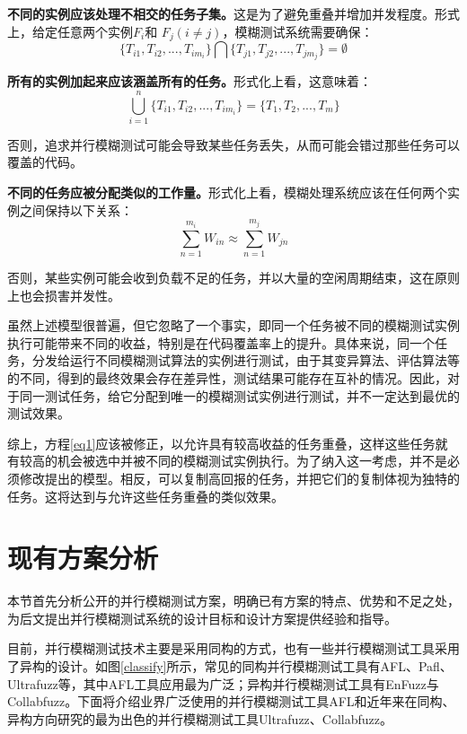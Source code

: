 \documentclass[master]{thesis-uestc}
\begin{document}
\textbf{不同的实例应该处理不相交的任务子集。}这是为了避免重叠并增加并发程度。形式上，给定任意两个实例$F_i$和 $F_j (i \neq j)$，模糊测试系统需要确保：
\begin{equation}
\{T_{i1}, T_{i2}, ..., T_{im_i}\} \bigcap \{T_{j1}, T_{j2}, ..., T_{jm_j}\} = \emptyset
\label{eq1}
\end{equation}

\textbf{所有的实例加起来应该涵盖所有的任务。}形式化上看，这意味着：
\begin{equation}
\bigcup_{i = 1}^{n} \{T_{i1}, T_{i2}, ..., T_{im_i}\} = \{T_{1}, T_{2}, ..., T_{m}\}
\end{equation}

否则，追求并行模糊测试可能会导致某些任务丢失，从而可能会错过那些任务可以覆盖的代码。

\textbf{不同的任务应被分配类似的工作量。}形式化上看，模糊处理系统应该在任何两个实例之间保持以下关系：
\begin{equation}
\sum_{n = 1}^{m_i}W_{in} \approx \sum_{n = 1}^{m_j}W_{jn} 
\end{equation}

否则，某些实例可能会收到负载不足的任务，并以大量的空闲周期结束，这在原则上也会损害并发性。

虽然上述模型很普遍，但它忽略了一个事实，即同一个任务被不同的模糊测试实例执行可能带来不同的收益，特别是在代码覆盖率上的提升。具体来说，同一个任务，分发给运行不同模糊测试算法的实例进行测试，由于其变异算法、评估算法等的不同，得到的最终效果会存在差异性，测试结果可能存在互补的情况。因此，对于同一测试任务，给它分配到唯一的模糊测试实例进行测试，并不一定达到最优的测试效果。

综上，方程\ref{eq1}应该被修正，以允许具有较高收益的任务重叠，这样这些任务就有较高的机会被选中并被不同的模糊测试实例执行。为了纳入这一考虑，并不是必须修改提出的模型。相反，可以复制高回报的任务，并把它们的复制体视为独特的任务。这将达到与允许这些任务重叠的类似效果。

\section{现有方案分析}
本节首先分析公开的并行模糊测试方案，明确已有方案的特点、优势和不足之处，为后文提出并行模糊测试系统的设计目标和设计方案提供经验和指导。

目前，并行模糊测试技术主要是采用同构的方式，也有一些并行模糊测试工具采用了异构的设计。如图\ref{classify}所示，常见的同构并行模糊测试工具有AFL、Pafl、Ultrafuzz等，其中AFL工具应用最为广泛；异构并行模糊测试工具有EnFuzz与Collabfuzz。下面将介绍业界广泛使用的并行模糊测试工具AFL和近年来在同构、异构方向研究的最为出色的并行模糊测试工具Ultrafuzz、Collabfuzz。
\end{document}
